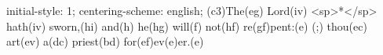 initial-style: 1;
centering-scheme: english;
(c3)The(eg) Lord(iv) <sp>*</sp> hath(iv) sworn,(hi) and(h) he(hg) will(f) not(hf) re(gf)pent:(e) (;) thou(ec) art(ev) a(dc) priest(bd) for(ef)ev(e)er.(e)
